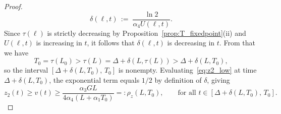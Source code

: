 \documentclass{article}
\begin{document}
\begin{proof}
\[        \delta(\ell,t) \,:=\; \frac{\ln 2}{\alpha_4 U(\ell,t)}.
    \]
    Since $\tau(\ell)$ is strictly decreasing by Proposition~\ref{prop:T_fixedpoint}(ii) 
    and $U(\ell,t)$ is increasing in $t$, it follows that $\delta(\ell,t)$ is decreasing in $t$.
    From that we have
    \begin{equation*}
        T_0 = \tau(L_0) > \tau(L) = \Delta + \delta(L,\tau(L)) 
        > \Delta + \delta(L,T_0),
    \end{equation*}
    so the interval $[\Delta+\delta(L,T_0),\,T_0]$ is nonempty. 
    Evaluating~\eqref{eq:z2_low} at time $\Delta+\delta(L,T_0)$, 
    the exponential term equals $1/2$ by definition of $\delta$, giving
    \begin{equation}\label{eq:z2_threshold}
        z_2(t) \ge v(t)
        \ge \frac{\alpha_3 GL}{4\alpha_4(L+\alpha_1 T_0)} 
        =: \rho_z(L,T_0),
        \qquad\text{for all } t\in[\Delta+\delta(L,T_0),\,T_0].
    \end{equation}
    

\end{proof}
\end{document}
